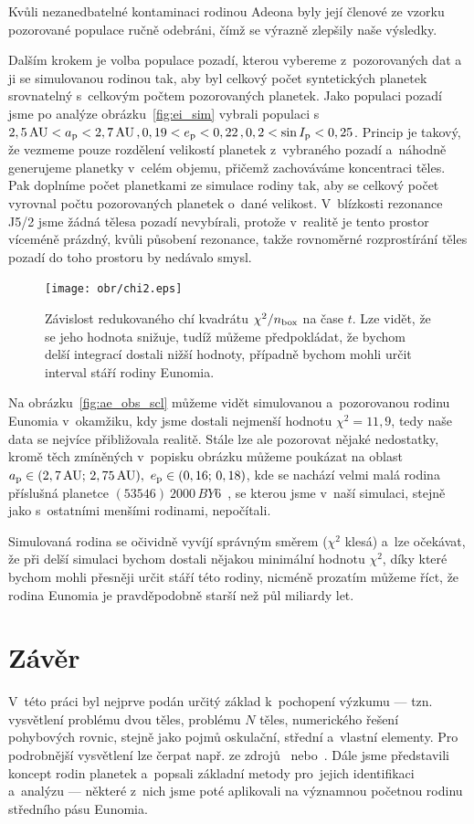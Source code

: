 \documentclass[A4paper, 12pt, oneside, openany]{book}
\begin{document}
Kvůli nezanedbatelné kontaminaci rodinou Adeona byly její členové ze vzorku pozorované populace ručně odebráni, čímž se výrazně zlepšily naše výsledky. 

Dalším krokem je volba populace pozadí, kterou vybereme z~pozorovaných dat a~ ji se simulovanou rodinou tak, aby byl celkový počet syntetických planetek srovnatelný s~celkovým počtem pozorovaných planetek. Jako populaci pozadí jsme po analýze obrázku~\ref{fig:ei_sim} vybrali populaci s~$2,5\,{\rm AU}< a_{\rm p} < 2,7\,{\rm AU}\,, 0,19 < e_{\rm p} < 0,22\,, 0,2 < \sin I_{\rm p} < 0,25$. Princip je takový, že vezmeme pouze rozdělení velikostí planetek z~vybraného pozadí a~náhodně generujeme planetky v~celém objemu, přičemž zachováváme koncentraci těles. Pak doplníme počet planetkami ze simulace rodiny tak, aby se celkový počet vyrovnal počtu pozorovaných planetek o~dané velikost. V~blízkosti rezonance J5/2 jsme žádná tělesa pozadí nevybírali, protože v~realitě je tento prostor víceméně prázdný, kvůli působení rezonance, takže rovnoměrné rozprostírání těles pozadí do toho prostoru by nedávalo smysl.

\begin{figure}
	\centering
	\texttt{[image: obr/chi2.eps]}
	\caption{Závislost redukovaného chí kvadrátu $\chi^2/n_{\rm box}$ na čase $t$. Lze vidět, že se jeho hodnota snižuje, tudíž můžeme předpokládat, že bychom delší integrací dostali nižší hodnoty, případně bychom mohli určit interval stáří rodiny Eunomia.} \label{fig:chi2}
\end{figure}

Na obrázku~\ref{fig:ae_obs_scl} můžeme vidět simulovanou a~pozorovanou rodinu Eunomia v~okamžiku, kdy jsme dostali nejmenší hodnotu $\chi^2=11,9$, tedy naše data se nejvíce přibližovala realitě. Stále lze ale pozorovat nějaké nedostatky, kromě těch zmíněných v~popisku obrázku můžeme poukázat na oblast $a_{\rm p}\in(2,7\,{\rm AU};\,2,75\,{\rm AU}),\ e_{\rm p}\in(0,16;\,0,18)$, kde se nachází velmi malá rodina příslušná planetce $(53546)\ 2000\,BY6$~\cite{milani14}, se kterou jsme v~naší simulaci, stejně jako s~ostatními menšími rodinami, nepočítali.

Simulovaná rodina se očividně vyvíjí správným směrem ($\chi^2$ klesá) a~lze očekávat, že při delší simulaci bychom dostali nějakou minimální hodnotu $\chi^2$, díky které bychom mohli přesněji určit stáří této rodiny, nicméně prozatím můžeme říct, že rodina Eunomia je pravděpodobně starší než půl miliardy let.

\chapter*{Závěr} \label{ch:zaver} 
V~této práci byl nejprve podán určitý základ k~pochopení výzkumu --- tzn. vysvětlení problému dvou těles, problému $N$ těles, numerického řešení pohybových rovnic, stejně jako pojmů oskulační, střední a~vlastní elementy. Pro podrobnější vysvětlení lze čerpat např. ze zdrojů~\cite{murray00} nebo~\cite{fmt}. Dále jsme představili koncept rodin planetek a~popsali základní metody pro~jejich identifikaci a~analýzu --- některé z~nich jsme poté aplikovali na významnou početnou rodinu středního pásu Eunomia.
\end{document}
